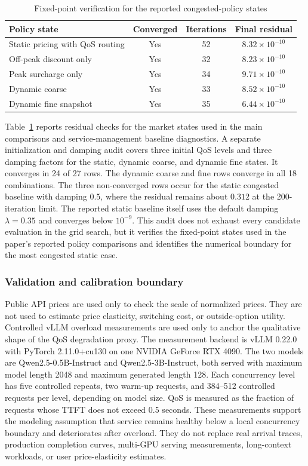 \documentclass[11pt,a4paper]{article}
\begin{document}
\begin{table}[H]
\centering
\caption{Fixed-point verification for the reported congested-policy states}
\label{tab:fixed_point_verification}
\small
\begin{tabular}{lccc}
\toprule
Policy state & Converged & Iterations & Final residual \\
\midrule
Static pricing with QoS routing & Yes & 52 & $8.32\times10^{-10}$ \\
Off-peak discount only & Yes & 32 & $8.23\times10^{-10}$ \\
Peak surcharge only & Yes & 34 & $9.71\times10^{-10}$ \\
Dynamic coarse & Yes & 33 & $8.52\times10^{-10}$ \\
Dynamic fine snapshot & Yes & 35 & $6.44\times10^{-10}$ \\
\bottomrule
\end{tabular}
\end{table}

Table~\ref{tab:fixed_point_verification} reports residual checks for the market states used in the main comparisons and service-management baseline diagnostics. A separate initialization and damping audit covers three initial QoS levels and three damping factors for the static, dynamic coarse, and dynamic fine states. It converges in 24 of 27 rows. The dynamic coarse and fine rows converge in all 18 combinations. The three non-converged rows occur for the static congested baseline with damping $0.5$, where the residual remains about $0.312$ at the 200-iteration limit. The reported static baseline itself uses the default damping $\lambda=0.35$ and converges below $10^{-9}$. This audit does not exhaust every candidate evaluation in the grid search, but it verifies the fixed-point states used in the paper's reported policy comparisons and identifies the numerical boundary for the most congested static case.

\subsubsection{Validation and calibration boundary}

Public API prices are used only to check the scale of normalized prices. They are not used to estimate price elasticity, switching cost, or outside-option utility. Controlled vLLM overload measurements are used only to anchor the qualitative shape of the QoS degradation proxy. The measurement backend is vLLM 0.22.0 with PyTorch 2.11.0+cu130 on one NVIDIA GeForce RTX 4090. The two models are Qwen2.5-0.5B-Instruct and Qwen2.5-3B-Instruct, both served with maximum model length 2048 and maximum generated length 128. Each concurrency level has five controlled repeats, two warm-up requests, and 384--512 controlled requests per level, depending on model size. QoS is measured as the fraction of requests whose TTFT does not exceed 0.5 seconds. These measurements support the modeling assumption that service remains healthy below a local concurrency boundary and deteriorates after overload. They do not replace real arrival traces, production completion curves, multi-GPU serving measurements, long-context workloads, or user price-elasticity estimates.
\end{document}
